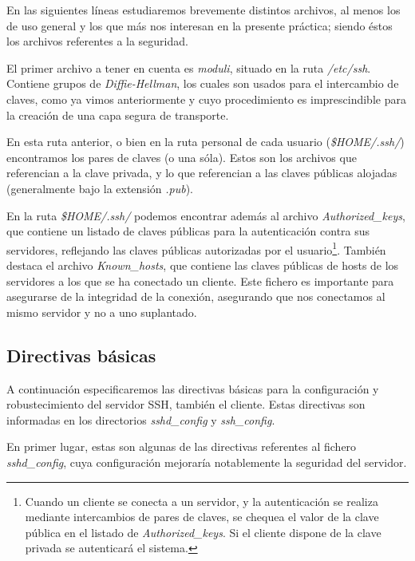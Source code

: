\documentclass[a4paper, 11pt, titlepage]{article}
\begin{document}
    En las siguientes líneas estudiaremos brevemente distintos archivos, al menos los de uso 
    general y los que más nos interesan en la presente práctica; siendo éstos los archivos referentes a 
    la seguridad.

    El primer archivo a tener en cuenta es \textit{moduli}, situado en la ruta \textit{/etc/ssh}. Contiene 
    grupos de \textit{Diffie-Hellman}, los cuales son usados para el intercambio de claves, como 
    ya vimos anteriormente y cuyo procedimiento es imprescindible para la creación de una capa segura 
    de transporte.

    En esta ruta anterior, o bien en la ruta personal de cada usuario (\textit{\$HOME/.ssh/}) encontramos 
    los pares de claves (o una sóla). Estos son los archivos que referencian a la clave privada, 
    y lo que referencian a las claves públicas alojadas (generalmente bajo la extensión \textit{.pub}).

    En la ruta \textit{\$HOME/.ssh/} podemos encontrar además al archivo \textit{Authorized\_keys}, que 
    contiene un listado de claves públicas para la autenticación contra sus servidores, reflejando las 
    claves públicas autorizadas por el usuario\footnote{
        Cuando un cliente se conecta a un servidor, y la autenticación se realiza mediante intercambios 
        de pares de claves, se chequea el valor de la clave pública en el listado de \textit{Authorized\_keys}.
        Si el cliente dispone de la clave privada se autenticará el sistema.
    }. También destaca el archivo \textit{Known\_hosts}, que contiene las claves públicas de hosts de los 
    servidores a los que se ha conectado un cliente. Este fichero es importante para asegurarse de la 
    integridad de la conexión, asegurando que nos conectamos al mismo servidor y no a uno suplantado.

    \subsection{Directivas básicas}

        A continuación especificaremos las directivas básicas para la configuración y robustecimiento 
        del servidor SSH, también el cliente. Estas directivas son informadas en los directorios 
        \textit{sshd\_config} y \textit{ssh\_config}.

        En primer lugar, estas son algunas de las directivas referentes al fichero \textit{sshd\_config}, 
        cuya configuración mejoraría notablemente la seguridad del servidor.
\end{document}
